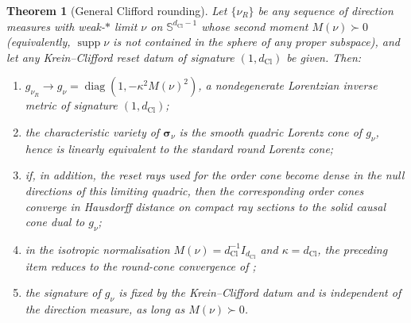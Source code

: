 \documentclass[11pt]{article}
\newtheorem{theorem}{Theorem}[section]
\theoremstyle{definition}
\theoremstyle{remark}
\newcommand{\dCl}{d_{\mathrm{Cl}}}
\newcommand{\Sphere}{\mathbb{S}}
\newcommand{\supp}{\operatorname{supp}}
\newcommand{\sym}{\boldsymbol{\sigma}}
\begin{document}
\begin{theorem}[General Clifford rounding]
\label{thm:general-rounding}
Let $\{\nu_R\}$ be any sequence of direction measures with weak-$*$ limit
$\nu$ on $\Sphere^{\dCl-1}$ whose second moment $M(\nu)\succ0$ (equivalently,
$\supp\nu$ is not contained in the sphere of any proper subspace), and let any
Krein--Clifford reset datum of signature $(1,\dCl)$ be given.  Then:
\begin{enumerate}[label=\textup{(\roman*)},leftmargin=2.2em]
\item $g_{\nu_R}\to g_\nu=\operatorname{diag}(1,-\kappa^2M(\nu)^2)$, a
      nondegenerate Lorentzian inverse metric of signature $(1,\dCl)$;
\item the characteristic variety of $\sym_{\nu}$ is the smooth quadric Lorentz
      cone of $g_\nu$, hence is linearly equivalent to the standard round
      Lorentz cone;
\item if, in addition, the reset rays used for the order cone become dense in
      the null directions of this limiting quadric, then the corresponding
      order cones converge in Hausdorff distance on compact ray sections to the
      solid causal cone dual to $g_\nu$;
\item in the isotropic normalisation $M(\nu)=\dCl^{-1}I_{\dCl}$ and
      $\kappa=\dCl$, the preceding item reduces to the round-cone convergence of
      ;
\item the signature of $g_\nu$ is fixed by the Krein--Clifford datum and is
      independent of the direction measure, as long as $M(\nu)\succ0$.
\end{enumerate}
\end{theorem}
\end{document}
